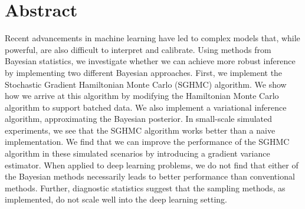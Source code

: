 \section*{Abstract}

Recent advancements in machine learning have led to complex models that, while powerful, are also difficult to interpret and calibrate.
Using methods from Bayesian statistics, we investigate whether we can achieve more robust inference by implementing two different Bayesian approaches.
First, we implement the Stochastic Gradient Hamiltonian Monte Carlo (SGHMC) algorithm.
We show how we arrive at this algorithm by modifying the Hamiltonian Monte Carlo algorithm to support batched data.
We also implement a variational inference algorithm, approximating the Bayesian posterior. 
In small-scale simulated experiments, we see that the SGHMC algorithm works better than a naive implementation.  
We find that we can improve the performance of the SGHMC algorithm in these simulated scenarios by introducing a gradient variance estimator.
When applied to deep learning problems, we do not find that either of the Bayesian methods necessarily leads to better performance than conventional methods. 
Further, diagnostic statistics suggest that the sampling methods, as implemented, do not scale well into the deep learning setting.












